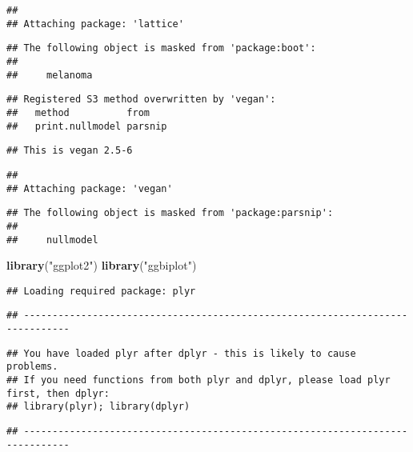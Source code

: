 \documentclass[
]{book}
\newenvironment{Shaded}{\begin{snugshade}}{\end{snugshade}}
\newcommand{\KeywordTok}[1]{\textcolor[rgb]{0.13,0.29,0.53}{\textbf{#1}}}
\newcommand{\NormalTok}[1]{#1}
\newcommand{\StringTok}[1]{\textcolor[rgb]{0.31,0.60,0.02}{#1}}
\begin{document}
\begin{verbatim}
## 
## Attaching package: 'lattice'
\end{verbatim}

\begin{verbatim}
## The following object is masked from 'package:boot':
## 
##     melanoma
\end{verbatim}

\begin{verbatim}
## Registered S3 method overwritten by 'vegan':
##   method          from   
##   print.nullmodel parsnip
\end{verbatim}

\begin{verbatim}
## This is vegan 2.5-6
\end{verbatim}

\begin{verbatim}
## 
## Attaching package: 'vegan'
\end{verbatim}

\begin{verbatim}
## The following object is masked from 'package:parsnip':
## 
##     nullmodel
\end{verbatim}

\begin{Shaded}
\begin{Highlighting}[]
\KeywordTok{library}\NormalTok{(}\StringTok{"ggplot2"}\NormalTok{)}
\KeywordTok{library}\NormalTok{(}\StringTok{"ggbiplot"}\NormalTok{)}
\end{Highlighting}
\end{Shaded}

\begin{verbatim}
## Loading required package: plyr
\end{verbatim}

\begin{verbatim}
## ------------------------------------------------------------------------------
\end{verbatim}

\begin{verbatim}
## You have loaded plyr after dplyr - this is likely to cause problems.
## If you need functions from both plyr and dplyr, please load plyr first, then dplyr:
## library(plyr); library(dplyr)
\end{verbatim}

\begin{verbatim}
## ------------------------------------------------------------------------------
\end{verbatim}
\end{document}
